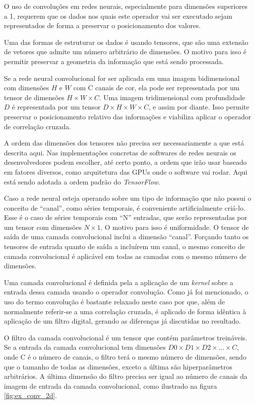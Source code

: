 O uso de convoluções em redes neurais, especialmente para dimensões superiores
a 1, requerem que os dados nos quais este operador vai ser executado sejam
representados de forma a preservar o posicionamento dos valores.

Uma das formas de estruturar os dados é usando tensores, que são uma
extensão de
vetores que admite um número arbitrário de dimensões. O motivo para isso é
permitir preservar a geometria da informação que está sendo processada.

Se a rede neural convolucional for ser aplicada em uma
imagem bidimensional com dimensões $H$ e $W$ com C canais de cor, ela pode ser
representada por um tensor de dimensões $H \times W \times C$. Uma imagem
tridimensional com profundidade $D$ é representada por um tensor
$D \times H \times W \times C$, e assim por
diante. Isso permite preservar o posicionamento relativo das informações
e viabiliza aplicar o operador de correlação cruzada.

A ordem das dimensões dos tensores não precisa ser necessariamente a que está
descrita aqui. Nas implementações concretas de softwares de redes neurais os
desenvolvedores podem escolher, até certo ponto, a ordem que irão usar baseado
em fatores diversos, como arquitetura das GPUs onde o software vai rodar. Aqui
está sendo adotada a ordem padrão do \emph{TensorFlow}.

Caso a rede neural esteja operando sobre um tipo de informação que não possui o
conceito de “canal”, como séries temporais, é conveniente artificialmente
criá-lo. Esse é o caso de séries temporais com “N” entradas, que serão
representadas por um tensor com dimensões $N\times1$. O motivo para isso é
uniformidade. O tensor de saída de uma camada convolucional inclui a dimensão
“canal”. Forçando tanto os tensores de entrada quanto de saída a incluírem um
canal, o mesmo conceito de camada convolucional é aplicável em todas as camadas
com o mesmo número de dimensões.

Uma camada convolucional é definida pela a aplicação de um \emph{kernel} sobre
a entrada dessa camada usando o operador convolução. Como já foi mencionado,
o uso do termo convolução
é bastante relaxado neste caso por que, além de normalmente referir-se a
uma correlação cruzada, é aplicado de forma idêntica à aplicação de um filtro
digital, gerando as diferenças já discutidas no resultado.

O filtro da camada convolucional é um tensor que contém parâmetros treináveis.
Se a entrada da camada convolucional tem dimensões
$D0 \times D1 \times D2 \times ... \times C$, onde C é o número de canais,
o filtro terá o mesmo número de dimensões, sendo que o tamanho de todas
as dimensões, exceto a última são
hiperparâmetros arbitrários. A última dimensão do filtro precisa ser igual ao
número de canais da imagem de entrada da camada convolucional, como ilustrado na
figura \ref{fig:ex_conv_2d}.


